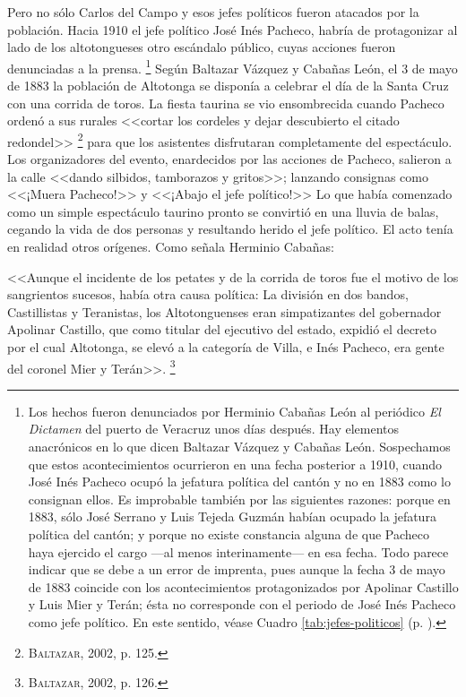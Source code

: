 \documentclass[14pt,twoside,final]{extbook} %
\let\oldfootnote\footnote
\renewcommand\footnote[1]{%
\oldfootnote{\hspace{1mm}#1}}
\begin{document}
Pero no sólo Carlos del Campo y esos jefes políticos fueron atacados por la población. Hacia 1910 el jefe político José Inés Pacheco, habría de protagonizar al lado de los altotongueses otro escándalo público, cuyas acciones fueron denunciadas a la prensa.\footnote{Los hechos fueron denunciados por Herminio Cabañas León al periódico \emph{El Dictamen} del puerto de Veracruz unos días después. Hay elementos anacrónicos en lo que dicen Baltazar Vázquez y Cabañas León. Sospechamos que estos acontecimientos ocurrieron en una fecha posterior a 1910, cuando José Inés Pacheco ocupó la jefatura política del cantón y no en 1883 como lo consignan ellos. Es improbable también por las siguientes razones: porque en 1883, sólo José Serrano y Luis Tejeda Guzmán habían ocupado la jefatura política del cantón; y porque no existe constancia alguna de que Pacheco haya ejercido el cargo ---al menos interinamente--- en esa fecha. Todo parece indicar que se debe a un error de imprenta, pues aunque la fecha 3 de mayo de 1883 coincide con los acontecimientos protagonizados por Apolinar Castillo y Luis Mier y Terán; ésta no corresponde con el periodo de José Inés Pacheco como jefe político. En este sentido, véase Cuadro \ref{tab:jefes-politicos} (p. \pageref{tab:jefes-politicos}).} Según Baltazar Vázquez y Cabañas León, el 3 de mayo de 1883 la población de Altotonga se disponía a celebrar el día de la Santa Cruz con una corrida de toros. La fiesta taurina se vio ensombrecida cuando Pacheco ordenó a sus rurales <<cortar los cordeles y dejar descubierto el citado redondel>>\footnote{\textsc{Baltazar}, 2002, p. 125.} para que los asistentes disfrutaran completamente del espectáculo. Los organizadores del evento, enardecidos por las acciones de Pacheco, salieron a la calle <<dando silbidos, tamborazos y gritos>>; lanzando consignas como <<¡Muera Pacheco!>> y <<¡Abajo el jefe político!>> Lo que había comenzado como un simple espectáculo taurino pronto se convirtió en una lluvia de balas, cegando la vida de dos personas y resultando herido el jefe político. El acto tenía en realidad otros orígenes. Como señala Herminio Cabañas:
\begin{quoting}
<<Aunque el incidente de los petates y de la corrida de toros fue el motivo de los sangrientos sucesos, había otra causa política: La división en dos bandos, Castillistas y Teranistas, los Altotonguenses eran simpatizantes del gobernador Apolinar Castillo, que como titular del ejecutivo del estado, expidió el decreto por el cual Altotonga, se elevó a la categoría de Villa, e Inés Pacheco, era gente del coronel Mier y Terán>>.\footnote{\textsc{Baltazar}, 2002, p. 126.}
\end{quoting}
\end{document}
